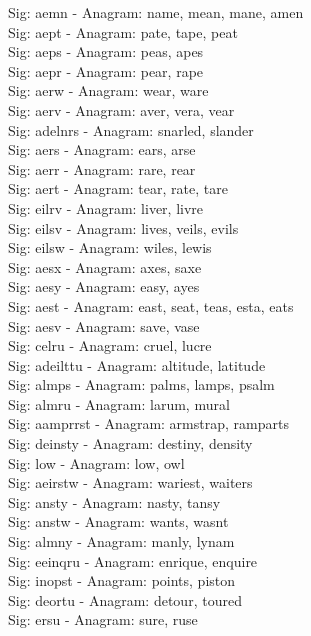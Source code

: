 Sig: {aemn} - Anagram: name, mean, mane, amen \\
Sig: {aept} - Anagram: pate, tape, peat \\
Sig: {aeps} - Anagram: peas, apes \\
Sig: {aepr} - Anagram: pear, rape \\
Sig: {aerw} - Anagram: wear, ware \\
Sig: {aerv} - Anagram: aver, vera, vear \\
Sig: {adelnrs} - Anagram: snarled, slander \\
Sig: {aers} - Anagram: ears, arse \\
Sig: {aerr} - Anagram: rare, rear \\
Sig: {aert} - Anagram: tear, rate, tare \\
Sig: {eilrv} - Anagram: liver, livre \\
Sig: {eilsv} - Anagram: lives, veils, evils \\
Sig: {eilsw} - Anagram: wiles, lewis \\
Sig: {aesx} - Anagram: axes, saxe \\
Sig: {aesy} - Anagram: easy, ayes \\
Sig: {aest} - Anagram: east, seat, teas, esta, eats \\
Sig: {aesv} - Anagram: save, vase \\
Sig: {celru} - Anagram: cruel, lucre \\
Sig: {adeilttu} - Anagram: altitude, latitude \\
Sig: {almps} - Anagram: palms, lamps, psalm \\
Sig: {almru} - Anagram: larum, mural \\
Sig: {aamprrst} - Anagram: armstrap, ramparts \\
Sig: {deinsty} - Anagram: destiny, density \\
Sig: {low} - Anagram: low, owl \\
Sig: {aeirstw} - Anagram: wariest, waiters \\
Sig: {ansty} - Anagram: nasty, tansy \\
Sig: {anstw} - Anagram: wants, wasnt \\
Sig: {almny} - Anagram: manly, lynam \\
Sig: {eeinqru} - Anagram: enrique, enquire \\
Sig: {inopst} - Anagram: points, piston \\
Sig: {deortu} - Anagram: detour, toured \\
Sig: {ersu} - Anagram: sure, ruse \\
